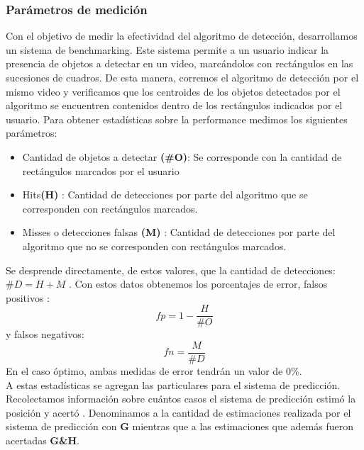 \subsubsection{Par\'ametros de medici\'on}
Con el objetivo de  medir la efectividad del algoritmo de detecci\'on, desarrollamos un sistema de benchmarking. Este sistema permite
a un usuario indicar la presencia de objetos a detectar en un video, marc\'andolos con rect\'angulos en las sucesiones de cuadros. De esta
manera, corremos el algoritmo de detecci\'on por el mismo video y verificamos que los centroides de los objetos detectados por el algoritmo 
se encuentren contenidos dentro de los rect\'angulos indicados por el 
usuario. Para obtener estad\'isticas sobre la performance  
medimos los siguientes par\'ametros:
\begin{itemize}
\item { Cantidad de objetos a detectar \textbf{(\#O)}: Se corresponde con la cantidad de rect\'angulos marcados por el usuario}
\item { Hits\textbf{(H)} : Cantidad de detecciones por parte del algoritmo que se corresponden con rect\'angulos marcados.}
\item { Misses o detecciones falsas \textbf{(M)} : Cantidad de detecciones por parte del algoritmo que no se corresponden con rect\'angulos marcados.}
\end{itemize}
Se desprende directamente, de estos valores, que la cantidad de detecciones: 
\textbf{$\#D=H+M$} .
Con estos datos obtenemos los porcentajes de error, falsos positivos : 
\[
	fp=1 - \frac{H}{\# O}
\]
y falsos negativos:
\[
	fn=\frac{M}{\# D}
\]
En el caso \'optimo, ambas medidas de error tendr\'an un valor de $0\%$.  \\
\indent A estas estad\'isticas se agregan las particulares para el sistema de predicci\'on. Recolectamos informaci\'on sobre
cu\'antos casos el sistema de predicci\'on estim\'o la posici\'on y acert\'o . Denominamos
a la cantidad de estimaciones realizada por el sistema de predicci\'on 
con \textbf{G} mientras que a las estimaciones que adem\'as fueron 
acertadas \textbf{G\&H}.


